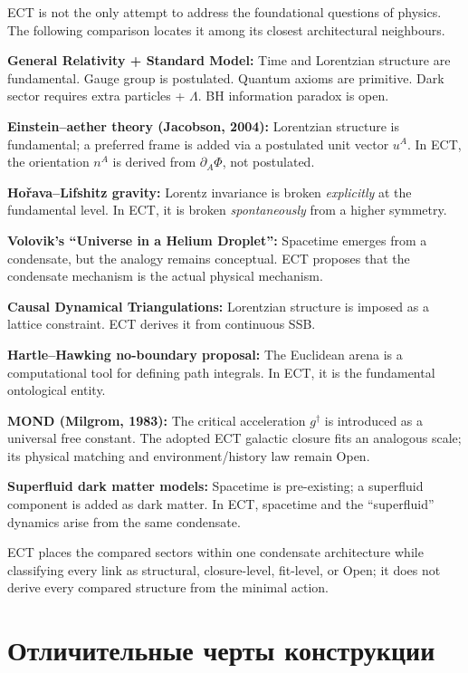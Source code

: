 \documentclass[11pt,a4paper]{article}
\begin{document}
ECT is not the only attempt to address the foundational questions of physics. The following comparison locates it among its closest architectural neighbours.

\textbf{General Relativity + Standard Model:} Time and Lorentzian structure are fundamental. Gauge group is postulated. Quantum axioms are primitive. Dark sector requires extra particles + $\Lambda$. BH information paradox is open.

\textbf{Einstein--aether theory (Jacobson, 2004):} Lorentzian structure is fundamental; a preferred frame is added via a postulated unit vector $u^A$. In ECT, the orientation $n^A$ is derived from $\partial_A\Phi$, not postulated.

\textbf{Ho\v{r}ava--Lifshitz gravity:} Lorentz invariance is broken \emph{explicitly} at the fundamental level. In ECT, it is broken \emph{spontaneously} from a higher symmetry.

\textbf{Volovik's ``Universe in a Helium Droplet'':} Spacetime emerges from a condensate, but the analogy remains conceptual. ECT proposes that the condensate mechanism is the actual physical mechanism.

\textbf{Causal Dynamical Triangulations:} Lorentzian structure is imposed as a lattice constraint. ECT derives it from continuous SSB.

\textbf{Hartle--Hawking no-boundary proposal:} The Euclidean arena is a computational tool for defining path integrals. In ECT, it is the fundamental ontological entity.

\textbf{MOND (Milgrom, 1983):} The critical acceleration $g^\dagger$ is introduced as a universal free constant.  The adopted ECT galactic closure fits an analogous scale; its physical matching and environment/history law remain Open.

\textbf{Superfluid dark matter models:} Spacetime is pre-existing; a superfluid component is added as dark matter. In ECT, spacetime and the ``superfluid'' dynamics arise from the same condensate.

ECT places the compared sectors within one condensate architecture while classifying every link as structural, closure-level, fit-level, or Open; it does not derive every compared structure from the minimal action.


\section{Отличительные черты конструкции}
\end{document}
